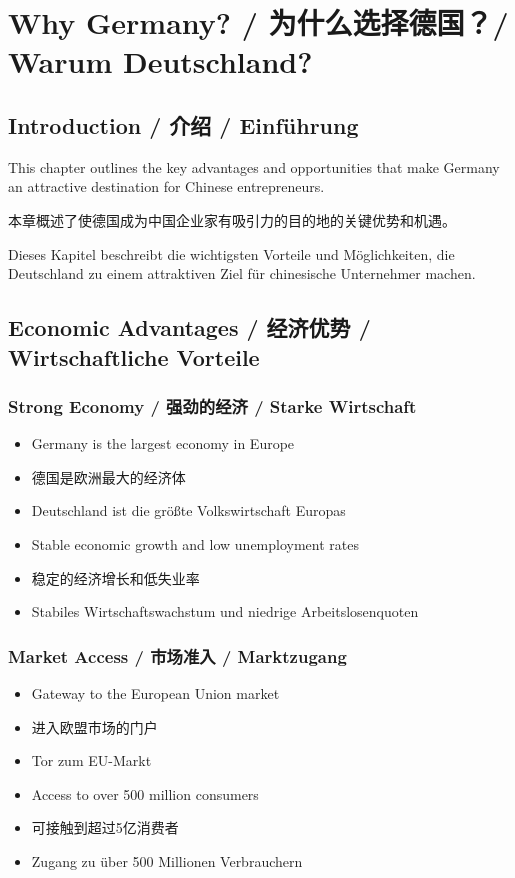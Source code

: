 \chapter{Why Germany? / 为什么选择德国？/ Warum Deutschland?}

\section{Introduction / 介绍 / Einführung}

This chapter outlines the key advantages and opportunities that make Germany an attractive destination for Chinese entrepreneurs.

本章概述了使德国成为中国企业家有吸引力的目的地的关键优势和机遇。

Dieses Kapitel beschreibt die wichtigsten Vorteile und Möglichkeiten, die Deutschland zu einem attraktiven Ziel für chinesische Unternehmer machen.

\section{Economic Advantages / 经济优势 / Wirtschaftliche Vorteile}

\subsection{Strong Economy / 强劲的经济 / Starke Wirtschaft}
\begin{itemize}
    \item Germany is the largest economy in Europe
    \item 德国是欧洲最大的经济体
    \item Deutschland ist die größte Volkswirtschaft Europas
    \item Stable economic growth and low unemployment rates
    \item 稳定的经济增长和低失业率
    \item Stabiles Wirtschaftswachstum und niedrige Arbeitslosenquoten
\end{itemize}

\subsection{Market Access / 市场准入 / Marktzugang}
\begin{itemize}
    \item Gateway to the European Union market
    \item 进入欧盟市场的门户
    \item Tor zum EU-Markt
    \item Access to over 500 million consumers
    \item 可接触到超过5亿消费者
    \item Zugang zu über 500 Millionen Verbrauchern
\end{itemize}

